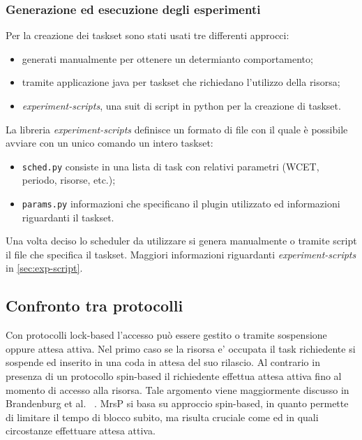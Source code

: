 \subsubsection{Generazione ed esecuzione degli esperimenti}

\noindent Per la creazione dei taskset sono stati usati tre differenti approcci:\\

\begin{itemize}
	\item generati manualmente per ottenere un determianto comportamento;
	\item tramite applicazione java per taskset che richiedano l'utilizzo della risorsa;
	\item \textit{experiment-scripts}, una suit di script in python per la creazione di taskset.
\end{itemize}

\noindent La libreria \textit{experiment-scripts} definisce un formato di file con il quale è possibile avviare con un unico comando un intero taskset:

\begin{itemize}
  \item \texttt{sched.py} consiste in una lista di task con relativi parametri (WCET, periodo, risorse, etc.);
  \item \texttt{params.py} informazioni che specificano il plugin utilizzato ed informazioni riguardanti il taskset.
\end{itemize}

\noindent Una volta deciso lo scheduler da utilizzare si genera manualmente o tramite script il file che specifica il taskset. Maggiori informazioni riguardanti \textit{experiment-scripts} in \ref{sec:exp-script}.\\

\newpage

\subsection{Confronto tra protocolli}
\label{sec:confronto_protocolli}

\noindent Con protocolli lock-based l'accesso può essere gestito o tramite sospensione oppure attesa attiva. Nel primo caso se la risorsa e' occupata il task richiedente si sospende ed inserito in una coda in attesa del suo rilascio. Al contrario in presenza di un protocollo spin-based il richiedente effettua attesa attiva fino al momento di accesso alla risorsa. Tale argomento viene maggiormente discusso in Brandenburg et al. ~\cite{Brandenburg:2008:RSM:1440456.1440601}. MrsP si basa su approccio spin-based, in quanto permette di limitare il tempo di blocco subito, ma risulta cruciale come ed in quali circostanze effettuare attesa attiva.\\


